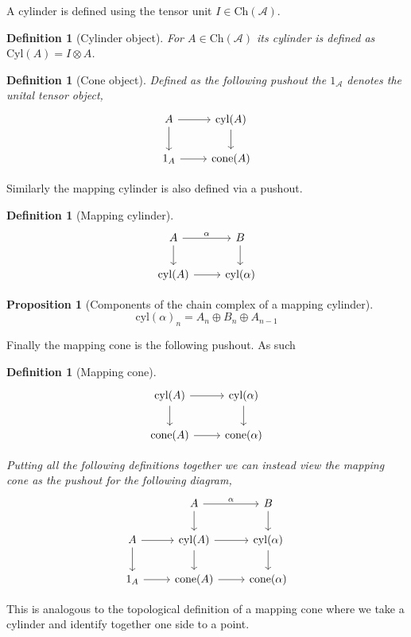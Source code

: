 \documentclass[12pt]{report}
\numberwithin{equation}{section}
\newtheorem{definition}[dummy]{Definition}
\newtheorem{proposition}[dummy]{Proposition}
\begin{document}
	A cylinder is defined using the tensor unit $I\in \mathrm{Ch}(\mathcal{A})$.
	\begin{definition}[Cylinder object]
		For $A \in \mathrm{Ch}(\mathcal{A})$ its cylinder is defined as $\mathrm{Cyl}(A)=I \otimes A$.
	\end{definition}
	\begin{definition}[Cone object]
		Defined as the following pushout the $1_\mathcal{A}$ denotes the unital tensor object,
		\[\begin{tikzcd}
			A & {\mathrm{cyl}(A)} \\
			1_A & {\mathrm{cone}(A)}
			\arrow[from=1-1, to=1-2]
			\arrow[from=1-1, to=2-1]
			\arrow[from=2-1, to=2-2]
			\arrow[from=1-2, to=2-2]
		\end{tikzcd}\]
	\end{definition}
	Similarly the mapping cylinder is also defined via a pushout.
	\begin{definition}[Mapping cylinder]\label{mappingcylinder}
		\[\begin{tikzcd}
			A & B \\
			{\mathrm{cyl}(A)} & {\mathrm{cyl}(\alpha)}
			\arrow["\alpha", from=1-1, to=1-2]
			\arrow[from=1-1, to=2-1]
			\arrow[from=1-2, to=2-2]
			\arrow[from=2-1, to=2-2]
		\end{tikzcd}\]
		
	\end{definition}
	
	\begin{proposition}[Components of the chain complex of a mapping cylinder]
		\[ \mathrm{cyl}(\alpha)_n=A_n\oplus B_n \oplus A_{n-1} \]
	\end{proposition}
	
	Finally the mapping cone is the following pushout. As such 
	\begin{definition}[Mapping cone]\label{mappingcone}
		\[\begin{tikzcd}
			{\mathrm{cyl}(A)} & {\mathrm{cyl}(\alpha)} \\
			{\mathrm{cone}(A)} & {\mathrm{cone}(\alpha)}
			\arrow[from=1-1, to=1-2]
			\arrow[from=1-1, to=2-1]
			\arrow[from=1-2, to=2-2]
			\arrow[from=2-1, to=2-2]
		\end{tikzcd}\]
		
		Putting all the following definitions together we can instead view the mapping cone as the pushout for the following diagram,
		\[\begin{tikzcd}
			& A & B \\
			A & {\mathrm{cyl}(A)} & {\mathrm{cyl}(\alpha)} \\
			1_A & {\mathrm{cone}(A)} & {\mathrm{cone}(\alpha)}
			\arrow[from=2-2, to=2-3]
			\arrow[from=2-2, to=3-2]
			\arrow[from=2-3, to=3-3]
			\arrow[from=3-2, to=3-3]
			\arrow["\alpha", from=1-2, to=1-3]
			\arrow[from=1-2, to=2-2]
			\arrow[from=1-3, to=2-3]
			\arrow[from=2-1, to=2-2]
			\arrow[from=2-1, to=3-1]
			\arrow[from=3-1, to=3-2]
		\end{tikzcd}\]
	\end{definition}
	This is analogous to the topological definition of a mapping cone where we take a cylinder and identify together one side to a point.
	
\end{document}
